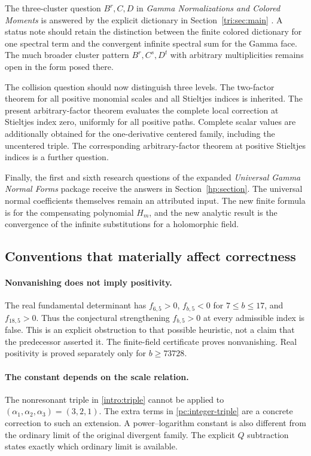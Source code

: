 The three-cluster question $B^r,C,D$ in
\emph{Gamma Normalizations and Colored Moments} is answered by the
explicit dictionary in Section~\ref{tri:sec:main}
\cite{GammaColored}. A status note should retain the distinction between
the finite colored dictionary for one spectral term and the convergent
infinite spectral sum for the Gamma face. The much broader cluster
pattern $B^r,C^s,D^t$ with arbitrary multiplicities remains open in the
form posed there.

The collision question should now distinguish three levels. The
two-factor theorem for all positive monomial scales and all Stieltjes
indices is inherited. The present arbitrary-factor theorem evaluates
the complete local correction at Stieltjes index zero, uniformly for
all positive paths. Complete scalar values are additionally obtained
for the one-derivative centered family, including the uncentered
triple. The corresponding arbitrary-factor theorem at positive
Stieltjes indices is a further question.

Finally, the first and sixth research questions of the expanded
\emph{Universal Gamma Normal Forms} package receive the answers in
Section~\ref{hp:section}. The universal normal coefficients themselves
remain an attributed input. The new finite formula is for the
compensating polynomial $H_m$, and the new analytic result is the
convergence of the infinite substitutions for a holomorphic field.

\subsection{Conventions that materially affect correctness}

\paragraph{Nonvanishing does not imply positivity.}
The real fundamental determinant has
$f_{6,5}>0$, $f_{b,5}<0$ for $7\le b\le17$, and $f_{18,5}>0$.
Thus the conjectural strengthening $f_{b,5}>0$ at every admissible
index is false. This is an explicit obstruction to that possible
heuristic, not a claim that the predecessor asserted it. The
finite-field certificate proves nonvanishing. Real positivity is
proved separately only for $b\ge73728$.

\paragraph{The constant depends on the scale relation.}
The nonresonant triple in \eqref{intro:triple} cannot be applied to
$(\alpha_1,\alpha_2,\alpha_3)=(3,2,1)$.
The extra terms in \eqref{pc:integer-triple} are a concrete correction
to such an extension. A power--logarithm constant is also different
from the ordinary limit of the original divergent family. The
explicit $Q$ subtraction states exactly which ordinary limit is
available.

